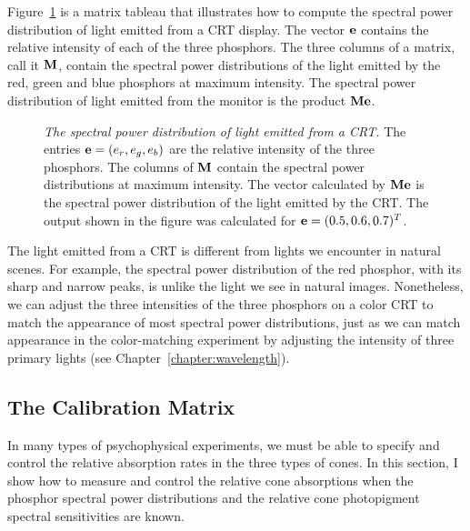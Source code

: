 Figure~\ref{fa2:monitor.mat} is a matrix tableau that illustrates how
to compute the spectral power distribution of light emitted from a CRT
display.  The vector $\mbox{$\bf e$}$ contains the relative intensity of each
of the three phosphors. The three columns of a matrix, call it
$\mbox{$ \bf M $}$, contain the spectral power distributions of the light
emitted by the red, green and blue phosphors at maximum intensity.
The spectral power distribution of light emitted from the monitor is
the product $\mbox{$ \bf M $} \mbox{$\bf e$}$.
\begin{figure}
\centerline {
}
\caption[Monitor Matrix]{
{\em The spectral power distribution of light emitted from a CRT.}
The entries $\mbox{$\bf e$} = (e_r, e_g, e_b)$ are the relative intensity of
the three phosphors.  The columns of $\mbox{$ \bf M $}$ contain the spectral
power distributions at maximum intensity.  The vector calculated by
$\mbox{$ \bf M $} \mbox{$\bf e$}$ is the spectral power distribution of the light
emitted by the CRT.  The output shown in the figure was calculated for
$\mbox{$\bf e$} = (0.5, 0.6,0.7)^T$. }
\label{fa2:monitor.mat}
\end{figure}

The light emitted from a CRT is different from lights we encounter in
natural scenes.  For example, the spectral power distribution of the
red phosphor, with its sharp and narrow peaks, is unlike the light we
see in natural images.  Nonetheless, we can adjust the three
intensities of the three phosphors on a color CRT to match the
appearance of most spectral power distributions, just as we can match
appearance in the color-matching experiment by adjusting the intensity
of three primary lights (see Chapter~\ref{chapter:wavelength}).

\subsection*{The Calibration Matrix}
In many types of psychophysical experiments, we must be able to
specify and control the relative absorption rates in the three types
of cones.  In this section, I show how to measure and control the
relative cone absorptions when the phosphor spectral power
distributions and the relative cone photopigment spectral
sensitivities are known.

